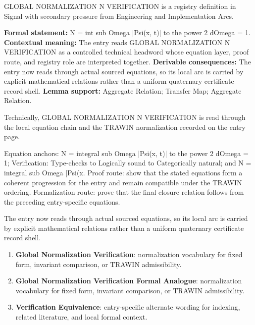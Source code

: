 
\begingroup\small
{}
GLOBAL NORMALIZATION N VERIFICATION is a registry definition in Signal with secondary pressure from Engineering and Implementation Arcs.

\begingroup\footnotesize\setlength{\emergencystretch}{3em}\sloppy
\textbf{Formal statement:} N = int sub Omega |Psi(x, t)| to the power 2 dOmega = 1. \textbf{Contextual meaning:} The entry reads GLOBAL NORMALIZATION N VERIFICATION as a controlled technical headword whose equation layer, proof route, and registry role are interpreted together. \textbf{Derivable consequences:} The entry now reads through actual sourced equations, so its local arc is carried by explicit mathematical relations rather than a uniform quaternary certificate record shell. \textbf{Lemma support:} Aggregate Relation; Transfer Map; Aggregate Relation.\par
\endgroup

Technically, GLOBAL NORMALIZATION N VERIFICATION is read through the local equation chain and the TRAWIN normalization recorded on the entry page.

Equation anchors: N = integral sub Omega |Psi(x, t)| to the power 2 dOmega = 1; Verification: Type-checks to Logically sound to Categorically natural; and N = integral sub Omega |Psi(x. Proof route: show that the stated equations form a coherent progression for the entry and remain compatible under the TRAWIN ordering. Formalization route: prove that the final closure relation follows from the preceding entry-specific equations.

The entry now reads through actual sourced equations, so its local arc is carried by explicit mathematical relations rather than a uniform quaternary certificate record shell.
\endgroup

\begin{enumerate}[leftmargin=1.6em,itemsep=6pt,topsep=4pt]
\item \textbf{Global Normalization Verification}: normalization vocabulary for fixed form, invariant comparison, or TRAWIN admissibility.
\item \textbf{Global Normalization Verification Formal Analogue}: normalization vocabulary for fixed form, invariant comparison, or TRAWIN admissibility.
\item \textbf{Verification Equivalence}: entry-specific alternate wording for indexing, related literature, and local formal context.
\end{enumerate}

